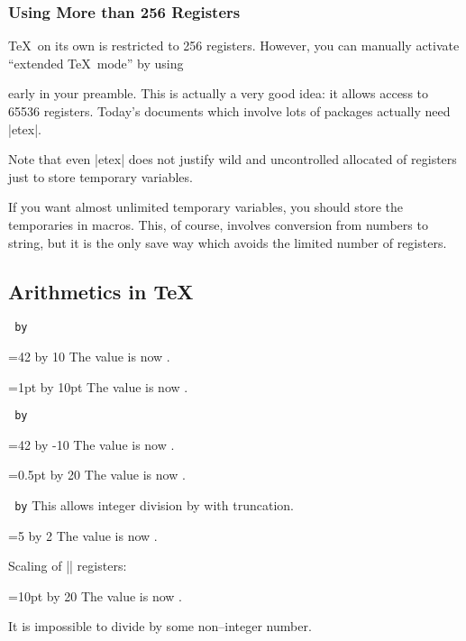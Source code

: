 \documentclass[a4paper,doc2]{ltxdoc}
\begin{document}
\subsubsection{Using More than 256 Registers}
\TeX\ on its own is restricted to 256 registers. However, you can manually activate ``extended \TeX\ mode'' by using
\begin{codeexample}
\usepackage{etex}
\end{codeexample}
early in your preamble. This is actually a very good idea: it allows access to 65536 registers. Today's documents which involve lots of packages actually need |etex|.

Note that even |etex| does not justify wild and uncontrolled allocated of registers just to store temporary variables.

If you want almost unlimited temporary variables, you should store the temporaries in macros. This, of course, involves conversion from numbers to string, but it is the only save way which avoids the limited number of registers.

\subsection{Arithmetics in \TeX}
\begin{command}{\advance{}\texttt{ by}}
\begin{codeexample}[]
=42
\advance{} by 10
The value is now \the{}.
\end{codeexample}

\begin{codeexample}[]
=1pt
\advance{} by 10pt
The value is now \the{}.
\end{codeexample}
\end{command}

\begin{command}{\multiply{}\texttt{ by}}
\begin{codeexample}[]
=42
\multiply{} by -10
The value is now \the{}.
\end{codeexample}

\begin{codeexample}[]
=0.5pt
\multiply{} by 20
The value is now \the{}.
\end{codeexample}
\end{command}

\begin{command}{\divide{}\texttt{ by}}
	This allows integer division by  with truncation.
\begin{codeexample}[]
=5
\divide{} by 2
The value is now \the{}.
\end{codeexample}

	Scaling of |\dimen| registers:
\begin{codeexample}[]
=10pt
\divide{} by 20
The value is now \the{}.
\end{codeexample}

	It is impossible to divide by some non--integer number.
\end{command}
\end{document}
